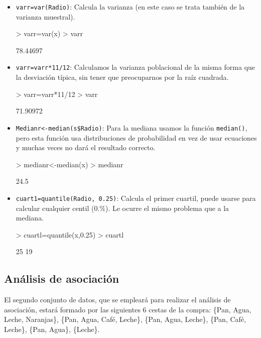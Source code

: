 \documentclass[a4paper, 12pt]{article}
\begin{document}
\begin{itemize}
		\item \texttt{varr=var(Radio)}: Calcula la varianza (en este caso se trata también de la varianza muestral).
\begin{Schunk}
\begin{Sinput}
> varr=var(x)
> varr
\end{Sinput}
\begin{Soutput}
[1] 78.44697
\end{Soutput}
\end{Schunk}
		\item \texttt{varr=varr*11/12}: Calculamos la varianza poblacional de la misma forma que la desviación típica, sin tener que preocuparnos por la raíz cuadrada.
\begin{Schunk}
\begin{Sinput}
> varr=varr*11/12
> varr
\end{Sinput}
\begin{Soutput}
[1] 71.90972
\end{Soutput}
\end{Schunk}
		\item \texttt{Medianr<-median(s\$Radio)}: Para la mediana usamos la función \texttt{median()}, pero esta función usa distribuciones de probabilidad en vez de usar ecuaciones y muchas veces no dará el resultado correcto.
\begin{Schunk}
\begin{Sinput}
> medianr<-median(x)
> medianr
\end{Sinput}
\begin{Soutput}
[1] 24.5
\end{Soutput}
\end{Schunk}
		\item \texttt{cuart1=quantile(Radio, 0.25)}: Calcula el primer cuartil, puede usarse para calcular cualquier centil (0.\%). Le ocurre el mismo problema que a la mediana.
\begin{Schunk}
\begin{Sinput}
> cuartl=quantile(x,0.25)
> cuartl
\end{Sinput}
\begin{Soutput}
25%
 19 
\end{Soutput}
\end{Schunk}
	\end{itemize}
	
	
	\subsection{Análisis de asociación}
	El segundo conjunto de datos, que se empleará para realizar el análisis de asociación, estará formado por las siguientes 6 cestas de la compra: \{Pan, Agua, Leche, Naranjas\}, \{Pan, Agua, Café, Leche\}, \{Pan, Agua, Leche\}, \{Pan, Café, Leche\}, \{Pan, Agua\}, \{Leche\}.
	
\end{document}
